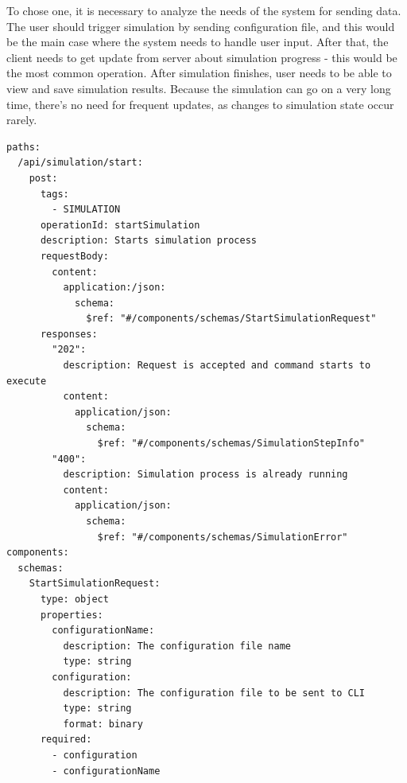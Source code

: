 To chose one, it is necessary to analyze the needs of the system for sending data. The user should trigger simulation by sending configuration file, and this would be the main case where the system needs to handle user input. After that, the client needs to get update from server about simulation progress - this would be the most common operation. After simulation finishes, user needs to be able to view and save simulation results. Because the simulation can go on a very long time, there's no need for frequent updates, as changes to simulation state occur rarely. 
\newpage
\begin{lstlisting}[label=list:openapi-route,caption=The OpenAPI route definition for simulation start, basicstyle=\footnotesize\ttfamily]
paths:
  /api/simulation/start:
    post:
      tags:
        - SIMULATION
      operationId: startSimulation
      description: Starts simulation process
      requestBody:
        content:
          application:/json:
            schema:
              $ref: "#/components/schemas/StartSimulationRequest"
      responses:
        "202":
          description: Request is accepted and command starts to execute
          content:
            application/json:
              schema:
                $ref: "#/components/schemas/SimulationStepInfo"
        "400":
          description: Simulation process is already running
          content:
            application/json:
              schema:
                $ref: "#/components/schemas/SimulationError"
components:
  schemas:
    StartSimulationRequest:
      type: object
      properties:
        configurationName:
          description: The configuration file name
          type: string
        configuration:
          description: The configuration file to be sent to CLI
          type: string
          format: binary
      required:
        - configuration
        - configurationName
\end{lstlisting}

